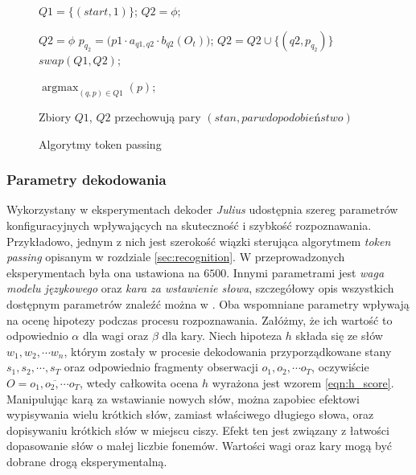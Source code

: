 \documentclass[shortabstract, mgr]{iithesis}
\DeclareMathOperator*{\argmax}{\arg\max}   %
\begin{document}
		    \begin{figure}
		    	\begin{algorithmic}[1]
		    		
		    		
		    		\STATE $Q1 = \{(start, 1)\}$; 
		    		\STATE $Q2 = \phi$;		    
		    		
			    		\STATE $Q2 = \phi$
					    		\STATE $p_{q_2} = \bigg( p1\cdot a_{q1,q2}\cdot b_{q2}(O_t) \label{line:b_q} \bigg)$;				    	
					    		\STATE $Q2 = Q2 \cup \{(q2, p_{q_2})\}$
				    		\ENDFOR
			    		\ENDFOR
			    		\STATE $swap(Q1, Q2)$;
		    		\ENDFOR
		    		
		    		\RETURN $\argmax_{(q,p)\in Q1}(p)$;
		    	\end{algorithmic}
	    	
		    	Zbiory $Q1$, $Q2$ przechowują pary $(stan, parwdopodobieństwo)$ 
		    	
		    	\caption{Algorytmy token passing}
		    	\label{alg:token_passing}
		    \end{figure}				   	
       

\subsubsection{Parametry dekodowania}
	\label{sec:meta_params}
	 	Wykorzystany w eksperymentach dekoder \textit{Julius} udostępnia szereg parametrów konfiguracyjnych wpływających na skuteczność i szybkość rozpoznawania. Przykładowo, jednym z nich jest szerokość wiązki sterująca algorytmem \textit{token passing} opisanym w rozdziale \ref{sec:recognition}. W przeprowadzonych eksperymentach była ona ustawiona na $6500$. Innymi parametrami jest \textit{waga modelu językowego} oraz \textit{kara za wstawienie słowa}, szczegółowy opis wszystkich dostępnym parametrów znaleźć można w \cite{juliusbook}. Oba wspomniane parametry wpływają na ocenę hipotezy podczas procesu rozpoznawania. Załóżmy, że ich wartość to odpowiednio $\alpha$ dla wagi oraz $\beta$ dla kary. Niech hipoteza $h$ składa się ze słów $w_1, w_2, \cdots w_n$, którym zostały w procesie dekodowania przyporządkowane stany $s_1,s_2,\cdots,s_T$ oraz odpowiednio fragmenty obserwacji $o_1, o_2, \cdots o_T$, oczywiście $O=\overline{o_1,o_2,\cdots o_T}$, wtedy całkowita ocena $h$ wyrażona jest wzorem \ref{eqn:h_score}. Manipulując karą za wstawianie nowych słów, można zapobiec efektowi wypisywania wielu krótkich słów, zamiast właściwego długiego słowa, oraz dopisywaniu krótkich słów w miejscu ciszy. Efekt ten jest związany z łatwości dopasowanie słów o małej liczbie fonemów.  Wartości wagi oraz kary mogą być dobrane drogą eksperymentalną.
	
\end{document}
